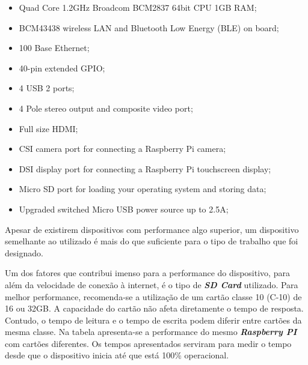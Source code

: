 \begin{itemize}
 \item Quad Core 1.2GHz Broadcom BCM2837 64bit CPU
1GB RAM;
 \item BCM43438 wireless LAN and Bluetooth Low Energy (BLE) on board;
 \item 100 Base Ethernet;
 \item 40-pin extended GPIO;
 \item 4 USB 2 ports;
 \item 4 Pole stereo output and composite video port;
 \item Full size HDMI;
 \item CSI camera port for connecting a Raspberry Pi camera;
 \item DSI display port for connecting a Raspberry Pi touchscreen display;
 \item Micro SD port for loading your operating system and storing data;
 \item Upgraded switched Micro USB power source up to 2.5A;
\end{itemize}

\hspace{1cm}Apesar de existirem dispositivos com performance algo superior, um dispositivo semelhante ao utilizado é mais do que suficiente para o tipo de trabalho que foi designado.

\hspace{1cm}Um dos fatores que contribui imenso para a performance do dispositivo, para além da velocidade de conexão à internet, é o tipo de \textbf{\textit{SD Card}} utilizado. Para melhor performance, recomenda-se a utilização de um cartão classe 10 (C-10) de 16 ou 32GB. A capacidade do cartão não afeta diretamente o tempo de resposta. Contudo, o tempo de leitura e o tempo de escrita podem diferir entre cartões da mesma classe. Na tabela apresenta-se a performance do mesmo \textbf{\textit{Raspberry PI}} com cartões diferentes. Os tempos apresentados serviram para medir o tempo desde que o dispositivo inicia até que está 100\% operacional.

